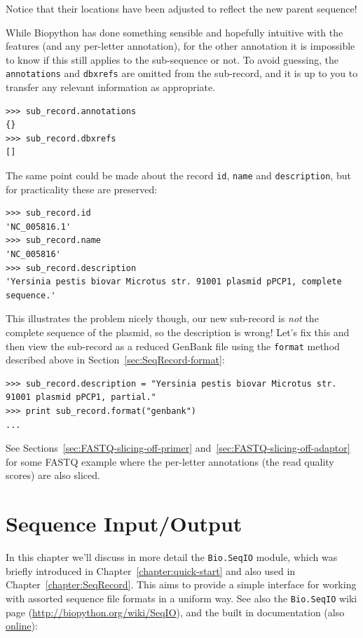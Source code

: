 \documentclass{report}
\begin{document}
\noindent Notice that their locations have been adjusted to reflect the new parent sequence!

While Biopython has done something sensible and hopefully intuitive with the features
(and any per-letter annotation), for the other annotation it is impossible to know if
this still applies to the sub-sequence or not. To avoid guessing, the \texttt{annotations}
and \texttt{dbxrefs} are omitted from the sub-record, and it is up to you to transfer
any relevant information as appropriate.

\begin{verbatim}
>>> sub_record.annotations
{}
>>> sub_record.dbxrefs
[]
\end{verbatim}

The same point could be made about the record \texttt{id}, \texttt{name}
and \texttt{description}, but for practicality these are preserved:

\begin{verbatim}
>>> sub_record.id
'NC_005816.1'
>>> sub_record.name
'NC_005816'
>>> sub_record.description
'Yersinia pestis biovar Microtus str. 91001 plasmid pPCP1, complete sequence.'
\end{verbatim}

\noindent This illustrates the problem nicely though, our new sub-record is
\emph{not} the complete sequence of the plasmid, so the description is wrong!
Let's fix this and then view the sub-record as a reduced GenBank file using
the \texttt{format} method described above in Section~\ref{sec:SeqRecord-format}:

\begin{verbatim}
>>> sub_record.description = "Yersinia pestis biovar Microtus str. 91001 plasmid pPCP1, partial."
>>> print sub_record.format("genbank")
...
\end{verbatim}

See Sections~\ref{sec:FASTQ-slicing-off-primer}
and~\ref{sec:FASTQ-slicing-off-adaptor} for some FASTQ example where the
per-letter annotations (the read quality scores) are also sliced.

\chapter{Sequence Input/Output}
\label{chapter:Bio.SeqIO}

In this chapter we'll discuss in more detail the \verb|Bio.SeqIO| module, which was briefly introduced in Chapter~\ref{chapter:quick-start} and also used in Chapter~\ref{chapter:SeqRecord}. This aims to provide a simple interface for working with assorted sequence file formats in a uniform way.
See also the \verb|Bio.SeqIO| wiki page (\url{http://biopython.org/wiki/SeqIO}), and the built in documentation (also \href{http://biopython.org/DIST/docs/api/Bio.SeqIO-module.html}{online}):
\end{document}
